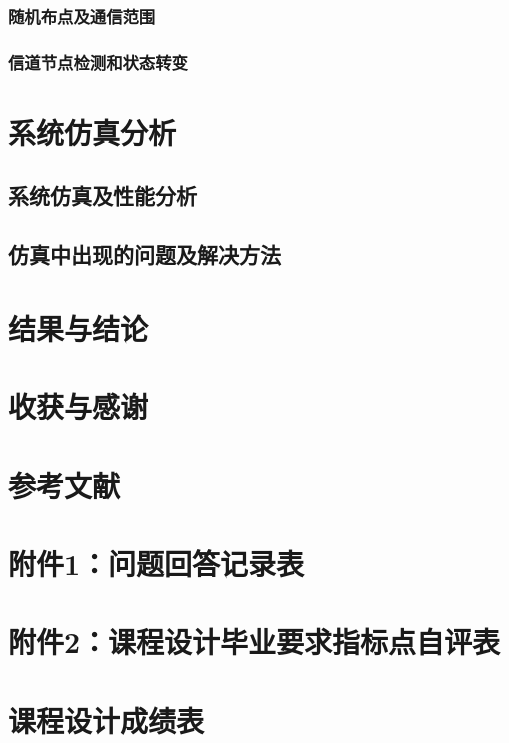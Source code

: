 \documentclass{article}
\begin{document}
	\subsubsection{随机布点及通信范围}
	\subsubsection{信道节点检测和状态转变}
	
	\section{系统仿真分析}
	\subsection{系统仿真及性能分析}
	\subsection{仿真中出现的问题及解决方法}
	\section{结果与结论}
	\section{收获与感谢}
	\section{参考文献}
	\section{附件1：问题回答记录表}
	\section{附件2：课程设计毕业要求指标点自评表}
	\section{课程设计成绩表}
\end{document}
